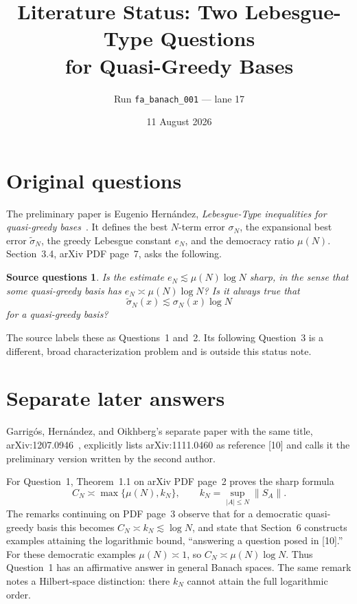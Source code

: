 \documentclass[11pt]{article}
\title{Literature Status: Two Lebesgue-Type Questions\\
for Quasi-Greedy Bases}
\author{Run \texttt{fa\_banach\_001} --- lane 17}
\date{11 August 2026}
\newtheorem*{question}{Source questions}
\begin{document}
\maketitle

\begin{center}
\end{center}

\section{Original questions}

The preliminary paper is Eugenio Hern\'andez,
\emph{Lebesgue-Type inequalities for quasi-greedy bases}~\cite{source}.
It defines the best $N$-term error $\sigma_N$,
the expansional best error $\widetilde\sigma_N$, the greedy Lebesgue constant
$e_N$, and the democracy ratio $\mu(N)$.  Section~3.4, arXiv PDF page~7,
asks the following.

\begin{question}
Is the estimate $e_N\lesssim \mu(N)\log N$ sharp, in the sense that some
quasi-greedy basis has $e_N\asymp\mu(N)\log N$?  Is it always true that
\[
  \widetilde\sigma_N(x)\lesssim \sigma_N(x)\log N
\]
for a quasi-greedy basis?
\end{question}

The source labels these as Questions~1 and~2.  Its following Question~3 is a
different, broad characterization problem and is outside this status note.

\section{Separate later answers}

Garrig\'os, Hern\'andez, and Oikhberg's separate paper with the same title,
arXiv:1207.0946~\cite{answerpaper}, explicitly lists arXiv:1111.0460 as
reference [10] and calls it the preliminary version written by the second
author.

For Question~1, Theorem~1.1 on arXiv PDF page~2 proves the sharp formula
\[
   C_N\asymp \max\{\mu(N),k_N\},
   \qquad
   k_N=\sup_{|A|\le N}\|S_A\|.
\]
The remarks continuing on PDF page~3 observe that for a democratic
quasi-greedy basis this becomes $C_N\asymp k_N\lesssim\log N$, and state that
Section~6 constructs examples attaining the logarithmic bound, ``answering a
question posed in [10].''  For these democratic examples $\mu(N)\asymp1$,
so $C_N\asymp\mu(N)\log N$.  Thus Question~1 has an affirmative answer in
general Banach spaces.  The same remark notes a Hilbert-space distinction:
there $k_N$ cannot attain the full logarithmic order.
\end{document}
